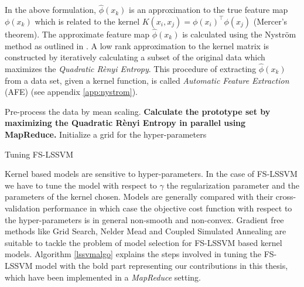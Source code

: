 In the above formulation, $\hat{\phi}(x_k)$ is an approximation to the true feature map $\phi(x_k)$ which is related to the kernel $K(x_i, x_j) = \phi(x_i)^{\intercal} \phi(x_j)$ (Mercer's theorem). The approximate feature map $\hat{\phi}(x_k)$ is calculated using the Nystr\"om method as outlined in \cite{DeBrabanter2010, Mall2015, Mall2013}. A low rank approximation to the kernel matrix is constructed by iteratively calculating a subset of the original data which maximizes the \textit{Quadratic R\`enyi Entropy}. This procedure of extracting $\hat{\phi}(x_k)$ from a data set, given a kernel function, is called \textit{Automatic Feature Extraction} (AFE) (see appendix \ref{app:nystrom}).

\begin{algorithm}[!ht] \label{lssvmalgo}
\SetAlgoLined
{}
 Pre-process the data by mean scaling.\;
 \textbf{Calculate the prototype set by maximizing the Quadratic R\`enyi Entropy in parallel using MapReduce.}\;
 Initialize a grid for the hyper-parameters\;
 \caption{Tuning FS-LSSVM}
\end{algorithm}

Kernel based models are sensitive to hyper-parameters. In the case of FS-LSSVM we have to tune the model with respect to $\gamma$ the regularization parameter and the parameters of the kernel chosen. Models are generally compared with their cross-validation performance in which case the objective cost function with respect to the hyper-parameters is in general non-smooth and non-convex. Gradient free methods like Grid Search, Nelder Mead \cite{Nelder1965} and Coupled Simulated Annealing \cite{Xavier-De-Souza2010} are suitable to tackle the problem of model selection for FS-LSSVM based kernel models. Algorithm \ref{lssvmalgo} explains the steps involved in tuning the FS-LSSVM model with the bold part representing our contributions in this thesis, which have been implemented in a \textit{MapReduce} setting.
